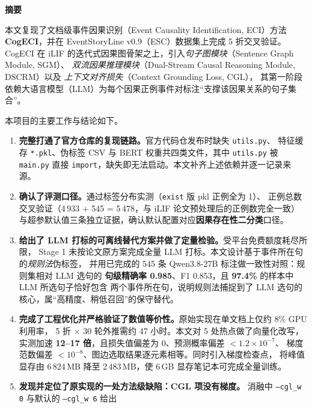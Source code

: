 \begin{center}
  \textbf{\large 摘\quad 要}
\end{center}

\vspace{-0.5em}

本文复现了文档级事件因果识别（Event Causality Identification, ECI）方法
\textbf{CogECI}，并在 EventStoryLine v0.9（ESC）数据集上完成 5 折交叉验证。
CogECI 在 iLIF 的迭代式因果图骨架之上，引入\emph{句子图模块}（Sentence Graph Module, SGM）、
\emph{双流因果推理模块}（Dual-Stream Causal Reasoning Module, DSCRM）以及
\emph{上下文对齐损失}（Context Grounding Loss, CGL），
其第一阶段依赖大语言模型（LLM）为每个因果正例事件对标注“支撑该因果关系的句子集合”。

本项目的主要工作与结论如下。

\begin{enumerate}
  \item \textbf{完整打通了官方仓库的复现链路。}官方代码仓发布时缺失 \texttt{utils.py}、
        特征缓存 \texttt{*.pkl}、伪标签 CSV 与 BERT 权重共四类文件，其中 \texttt{utils.py}
        被 \texttt{main.py} 直接 \texttt{import}，缺失即无法启动。本文补齐上述依赖并逐一记录来源。
  \item \textbf{确认了评测口径。}通过标签分布实测（\texttt{exist} 版 pkl 正例全为 1）、
        正例总数交叉验证（4\,933 + 545 = 5\,478，与 iLIF 论文预处理后的正例数完全一致）
        与超参默认值三条独立证据，确认默认配置对应\textbf{因果存在性二分类}口径。
  \item \textbf{给出了 LLM 打标的可离线替代方案并做了定量检验。}受平台免费额度耗尽所限，
        Stage 1 未按论文原方案完成全量 LLM 打标。本文设计基于事件所在句的\emph{规则法}伪标签，
        并用已完成的 545 条 Qwen3.8-27B 标注做一致性对照：规则集相对 LLM 选句的
        \textbf{句级精确率 0.985}、F1 0.853，且 \textbf{97.4\%} 的样本中 LLM 所选句子恰好包含
        两个事件所在句，说明规则法捕捉到了 LLM 选句的核心，属“高精度、稍低召回”的保守替代。
  \item \textbf{完成了工程优化并严格验证了数值等价性。}原始实现在单文档上仅约 8\% GPU 利用率，
        5 折 $\times$ 30 轮外推需约 47 小时。本文对 5 处热点做了向量化改写，
        实测加速 \textbf{12--17 倍}，且损失值偏差为 0、预测概率偏差 $<1.2\times10^{-7}$、
        梯度范数偏差 $<10^{-8}$、图边选取结果逐元素相等。同时引入梯度检查点，
        将峰值显存由 6\,824\,MB 降至 2\,483\,MB，使 6\,GB 显存笔记本可完成全量训练。
  \item \textbf{发现并定位了原实现的一处方法级缺陷：CGL 项没有梯度。}
        消融中 \texttt{--cgl\_w 0} 与默认的 \texttt{--cgl\_w 6} 给出

\end{enumerate}
